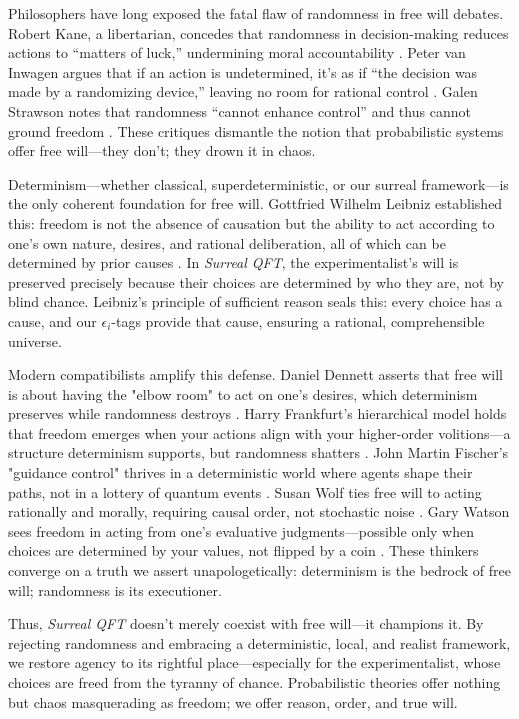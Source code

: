 \documentclass{article}
\begin{document}
Philosophers have long exposed the fatal flaw of randomness in free will debates. Robert Kane, a libertarian, concedes that randomness in decision-making reduces actions to ``matters of luck,'' undermining moral accountability \cite{Kane1996}. Peter van Inwagen argues that if an action is undetermined, it's as if ``the decision was made by a randomizing device,'' leaving no room for rational control \cite{vanInwagen1983}. Galen Strawson notes that randomness ``cannot enhance control'' and thus cannot ground freedom \cite{Strawson1994}. These critiques dismantle the notion that probabilistic systems offer free will---they don't; they drown it in chaos.

Determinism---whether classical, superdeterministic, or our surreal framework---is the only coherent foundation for free will. Gottfried Wilhelm Leibniz established this: freedom is not the absence of causation but the ability to act according to one's own nature, desires, and rational deliberation, all of which can be determined by prior causes \cite{Leibniz1686}. In \textit{Surreal QFT}, the experimentalist's will is preserved precisely because their choices are determined by who they are, not by blind chance. Leibniz's principle of sufficient reason seals this: every choice has a cause, and our \(\epsilon_i\)-tags provide that cause, ensuring a rational, comprehensible universe.

Modern compatibilists amplify this defense. Daniel Dennett asserts that free will is about having the "elbow room" to act on one's desires, which determinism preserves while randomness destroys \cite{Dennett1984}. Harry Frankfurt's hierarchical model holds that freedom emerges when your actions align with your higher-order volitions---a structure determinism supports, but randomness shatters \cite{Frankfurt1971}. John Martin Fischer's "guidance control" thrives in a deterministic world where agents shape their paths, not in a lottery of quantum events \cite{Fischer1994}. Susan Wolf ties free will to acting rationally and morally, requiring causal order, not stochastic noise \cite{Wolf1990}. Gary Watson sees freedom in acting from one's evaluative judgments---possible only when choices are determined by your values, not flipped by a coin \cite{Watson1975}. These thinkers converge on a truth we assert unapologetically: determinism is the bedrock of free will; randomness is its executioner.

Thus, \textit{Surreal QFT} doesn't merely coexist with free will---it champions it. By rejecting randomness and embracing a deterministic, local, and realist framework, we restore agency to its rightful place---especially for the experimentalist, whose choices are freed from the tyranny of chance. Probabilistic theories offer nothing but chaos masquerading as freedom; we offer reason, order, and true will.
\end{document}
